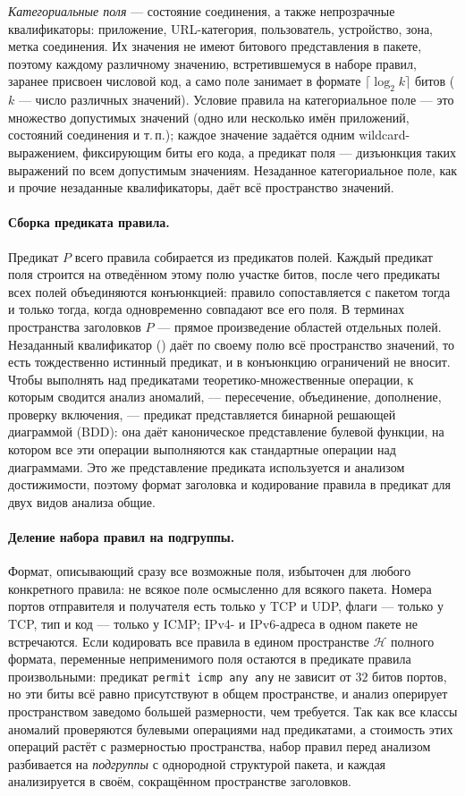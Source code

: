 \emph{Категориальные поля} --- состояние соединения, а также непрозрачные квалификаторы: приложение, URL-категория, пользователь, устройство, зона, метка соединения. Их значения не имеют битового представления в пакете, поэтому каждому различному значению, встретившемуся в наборе правил, заранее присвоен числовой код, а само поле занимает в формате $\lceil\log_2 k\rceil$ битов ($k$ --- число различных значений). Условие правила на категориальное поле --- это множество допустимых значений (одно или несколько имён приложений, состояний соединения и т.\,п.); каждое значение задаётся одним wildcard-выражением, фиксирующим биты его кода, а предикат поля --- дизъюнкция таких выражений по всем допустимым значениям. Незаданное категориальное поле, как и прочие незаданные квалификаторы, даёт всё пространство значений.

\paragraph{Сборка предиката правила.} Предикат $P$ всего правила собирается из предикатов полей. Каждый предикат поля строится на отведённом этому полю участке битов, после чего предикаты всех полей объединяются конъюнкцией: правило сопоставляется с пакетом тогда и только тогда, когда одновременно совпадают все его поля. В терминах пространства заголовков $P$ --- прямое произведение областей отдельных полей. Незаданный квалификатор () даёт по своему полю всё пространство значений, то есть тождественно истинный предикат, и в конъюнкцию ограничений не вносит. Чтобы выполнять над предикатами теоретико-множественные операции, к которым сводится анализ аномалий, --- пересечение, объединение, дополнение, проверку включения, --- предикат представляется бинарной решающей диаграммой (BDD): она даёт каноническое представление булевой функции, на котором все эти операции выполняются как стандартные операции над диаграммами. Это же представление предиката используется и анализом достижимости, поэтому формат заголовка и кодирование правила в предикат для двух видов анализа общие.

\paragraph{Деление набора правил на подгруппы.} Формат, описывающий сразу все возможные поля, избыточен для любого конкретного правила: не всякое поле осмысленно для всякого пакета. Номера портов отправителя и получателя есть только у TCP и UDP, флаги --- только у TCP, тип и код --- только у ICMP; IPv4- и IPv6-адреса в одном пакете не встречаются. Если кодировать все правила в едином пространстве $\mathcal{H}$ полного формата, переменные неприменимого поля остаются в предикате правила произвольными: предикат \texttt{permit icmp any any} не зависит от $32$ битов портов, но эти биты всё равно присутствуют в общем пространстве, и анализ оперирует пространством заведомо большей размерности, чем требуется. Так как все классы аномалий проверяются булевыми операциями над предикатами, а стоимость этих операций растёт с размерностью пространства, набор правил перед анализом разбивается на \emph{подгруппы} с однородной структурой пакета, и каждая анализируется в своём, сокращённом пространстве заголовков.

